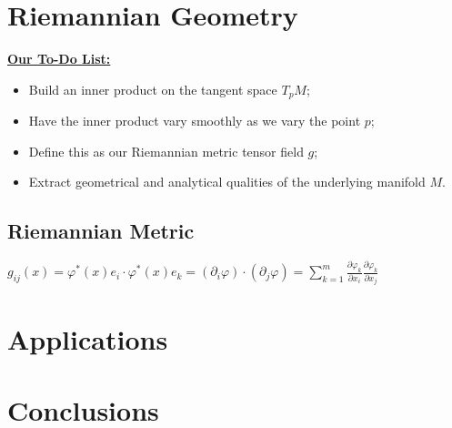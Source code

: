 \documentclass[UKenglish]{beamer}
\begin{document}
\begin{frame}{}
\vfill
\begin{figure}[H]
	\centering
	\def\svgwidth{\columnwidth}
	
\end{figure}
\vfill
\end{frame}

\begin{frame}{}
\vfill
\begin{figure}[H]
	\centering
	\def\svgwidth{\columnwidth}
	
\end{figure}
\vfill
\end{frame}

\section{Riemannian Geometry}

\begin{frame}{}
\vfill
\textbf{\underline{Our To-Do List:}}
\begin{itemize}
	\item Build an inner product on the tangent space $T_pM$;
	\pause
	\item Have the inner product vary smoothly as we vary the point $p$;
	\pause
	\item Define this as our Riemannian metric tensor field $g$;
	\pause
	\item Extract geometrical and analytical qualities of the underlying manifold $M$.
\end{itemize}
\vfill
\end{frame}


\subsection{Riemannian Metric}

\begin{frame}{}
\vfill
$g_{ij}(x) = \varphi^*(x)e_i \cdot \varphi^*(x)e_k = (\partial_i \varphi)\cdot (\partial_j \varphi) = \sum_{k=1}^m \frac{\partial \varphi_k}{\partial x_i}\frac{\partial \varphi_k}{\partial x_j}$
\vfill
\end{frame}

\begin{frame}{}

\end{frame}







\section{Applications}









\section{Conclusions}
\end{document}

